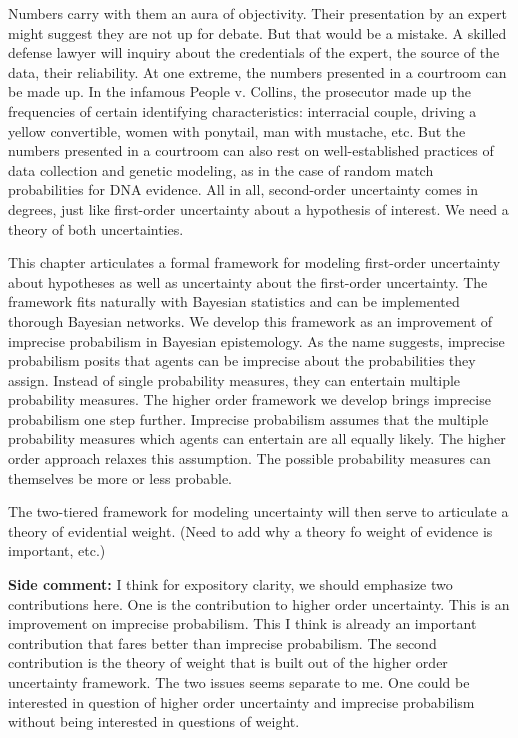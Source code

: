\documentclass[
  10pt,
  dvipsnames,enabledeprecatedfontcommands]{scrartcl}
\begin{document}
Numbers carry with them an aura of objectivity. Their presentation by an
expert might suggest they are not up for debate. But that would be a
mistake. A skilled defense lawyer will inquiry about the credentials of
the expert, the source of the data, their reliability. At one extreme,
the numbers presented in a courtroom can be made up. In the infamous
People v. Collins, the prosecutor made up the frequencies of certain
identifying characteristics: interracial couple, driving a yellow
convertible, women with ponytail, man with mustache, etc. But the
numbers presented in a courtroom can also rest on well-established
practices of data collection and genetic modeling, as in the case of
random match probabilities for DNA evidence. All in all, second-order
uncertainty comes in degrees, just like first-order uncertainty about a
hypothesis of interest. We need a theory of both uncertainties.

This chapter articulates a formal framework for modeling first-order
uncertainty about hypotheses as well as uncertainty about the
first-order uncertainty. The framework fits naturally with Bayesian
statistics and can be implemented thorough Bayesian networks. We develop
this framework as an improvement of imprecise probabilism in Bayesian
epistemology. As the name suggests, imprecise probabilism posits that
agents can be imprecise about the probabilities they assign. Instead of
single probability measures, they can entertain multiple probability
measures. The higher order framework we develop brings imprecise
probabilism one step further. Imprecise probabilism assumes that the
multiple probability measures which agents can entertain are all equally
likely. The higher order approach relaxes this assumption. The possible
probability measures can themselves be more or less probable.

The two-tiered framework for modeling uncertainty will then serve to
articulate a theory of evidential weight. (Need to add why a theory fo
weight of evidence is important, etc.)

\textbf{Side comment:} I think for expository clarity, we should
emphasize two contributions here. One is the contribution to higher
order uncertainty. This is an improvement on imprecise probabilism. This
I think is already an important contribution that fares better than
imprecise probabilism. The second contribution is the theory of weight
that is built out of the higher order uncertainty framework. The two
issues seems separate to me. One could be interested in question of
higher order uncertainty and imprecise probabilism without being
interested in questions of
weight.
\end{document}
